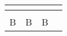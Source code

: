 \beforegrille

\begin{tabular}{|*{4}{C|}}
    \hline
     \\
    \hline
      &   &   &   \\
    \hline
    B & B &  B & \\
    \hline
\end{tabular}

